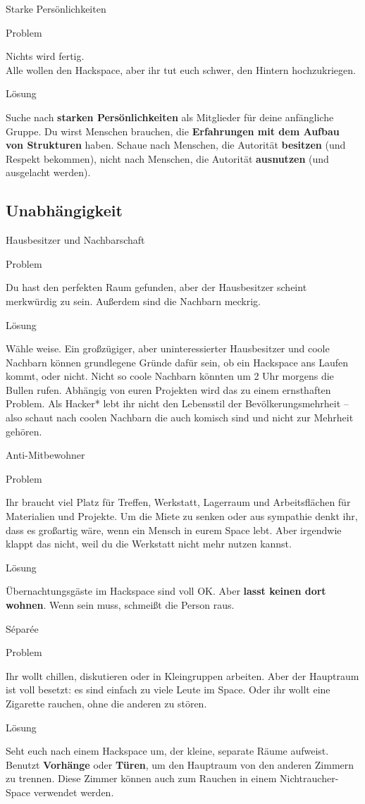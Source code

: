 \documentclass[aspectratio=43]{beamer}
\newcommand{\pattern}[2]{
  \begin{alertblock}{Problem}
    #1
  \end{alertblock}
  \pause
  \begin{exampleblock}{Lösung}
    #2
  \end{exampleblock}
}
\begin{document}
  \begin{frame}{Starke Persönlichkeiten}
    \pattern{
      Nichts wird fertig.\\
      Alle wollen den Hackspace, aber ihr tut euch schwer, den Hintern hochzukriegen.
    }{
      Suche nach \textbf{starken Persönlichkeiten} als Mitglieder für deine
      anfängliche Gruppe. Du wirst Menschen brauchen, die \textbf{Erfahrungen
      mit dem Aufbau von Strukturen} haben. Schaue nach Menschen, die
      Autorität \textbf{besitzen} (und Respekt bekommen), nicht nach Menschen,
      die Autorität \textbf{ausnutzen} (und ausgelacht werden).
    }
  \end{frame}

  \subsection{Unabhängigkeit}

  \begin{frame}{Hausbesitzer und Nachbarschaft}
    \pattern{
      Du hast den perfekten Raum gefunden, aber der Hausbesitzer scheint
      merkwürdig zu sein. Außerdem sind die Nachbarn meckrig.
    }{
      Wähle weise. Ein großzügiger, aber uninteressierter Hausbesitzer und coole
      Nachbarn können grundlegene Gründe dafür sein, ob ein Hackspace ans
      Laufen kommt, oder nicht. Nicht so coole Nachbarn könnten um 2 Uhr morgens
      die Bullen rufen. Abhängig von euren Projekten wird das zu einem
      ernsthaften Problem. Als Hacker* lebt ihr nicht den Lebensstil der
      Bevölkerungsmehrheit – also schaut nach coolen Nachbarn die auch komisch
      sind und nicht zur Mehrheit gehören.
    }
  \end{frame}

  \begin{frame}{Anti-Mitbewohner}
    \pattern{
      Ihr braucht viel Platz für Treffen, Werkstatt, Lagerraum und
      Arbeitsflächen für Materialien und Projekte. Um die Miete zu senken oder
      aus sympathie denkt ihr, dass es großartig wäre, wenn ein Mensch in eurem
      Space lebt. Aber irgendwie klappt das nicht, weil du die Werkstatt nicht
      mehr nutzen kannst.
    }{
      Übernachtungsgäste im Hackspace sind voll OK. Aber \textbf{lasst keinen
      dort wohnen}. Wenn sein muss, schmeißt die Person raus.
    }
  \end{frame}

  \begin{frame}{Séparée}
    \pattern{
      Ihr wollt chillen, diskutieren oder in Kleingruppen arbeiten. Aber der
      Hauptraum ist voll besetzt: es sind einfach zu viele Leute im Space. Oder
      ihr wollt eine Zigarette rauchen, ohne die anderen zu stören.
    }{
      Seht euch nach einem Hackspace um, der kleine, separate Räume aufweist.
      Benutzt \textbf{Vorhänge} oder \textbf{Türen}, um den Hauptraum von den
      anderen Zimmern zu trennen. Diese Zimmer können auch zum Rauchen in einem
      Nichtraucher-Space verwendet werden.
    }
  \end{frame}
\end{document}

